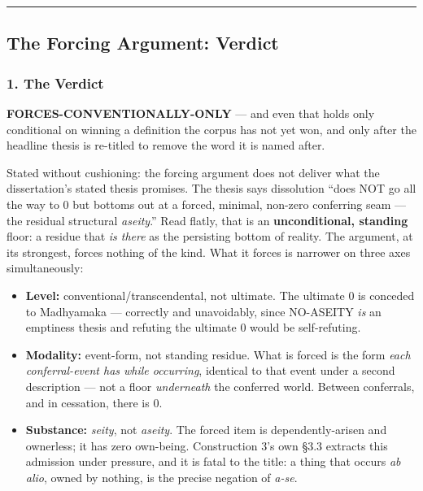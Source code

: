 \documentclass[11pt]{article}
\begin{document}
\medskip\noindent\rule{\linewidth}{0.3pt}\medskip

\subsection*{The Forcing Argument: Verdict}

\subsubsection*{1. The Verdict}

\textbf{FORCES-CONVENTIONALLY-ONLY} — and even that holds only conditional on winning a definition the corpus has not yet won, and only after the headline thesis is re-titled to remove the word it is named after.

Stated without cushioning: the forcing argument does not deliver what the dissertation's stated thesis promises. The thesis says dissolution ``does NOT go all the way to 0 but bottoms out at a forced, minimal, non-zero conferring seam — the residual structural \emph{aseity}.'' Read flatly, that is an \textbf{unconditional, standing} floor: a residue that \emph{is there} as the persisting bottom of reality. The argument, at its strongest, forces nothing of the kind. What it forces is narrower on three axes simultaneously:

\begin{itemize}
\item \textbf{Level:} conventional/\allowbreak{}transcendental, not ultimate. The ultimate 0 is conceded to Madhyamaka — correctly and unavoidably, since NO-ASEITY \emph{is} an emptiness thesis and refuting the ultimate 0 would be self-refuting.
\item \textbf{Modality:} event-form, not standing residue. What is forced is the form \emph{each conferral-event has while occurring}, identical to that event under a second description — not a floor \emph{underneath} the conferred world. Between conferrals, and in cessation, there is 0.
\item \textbf{Substance:} \emph{seity}, not \emph{aseity}. The forced item is dependently-arisen and ownerless; it has zero own-being. Construction 3's own §3.3 extracts this admission under pressure, and it is fatal to the title: a thing that occurs \emph{ab alio}, owned by nothing, is the precise negation of \emph{a-se}.
\end{itemize}
\end{document}

